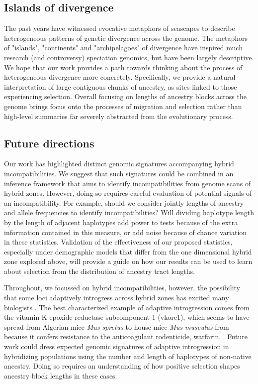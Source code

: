 \documentclass[12pt]{article}
\begin{document}
\subsection{Islands of divergence}  
The past years have witnessed evocative metaphors of seascapes to describe heterogeneous patterns of genetic divergence across the genome.  
The metaphors of "islands", "continents" and "archipelagoes" of divergence have inspired much research (and controversy) speciation genomics, but have been largely descriptive.  
We hope that our work provides a path towards thinking about the process of heterogeneous divergence more concretely. %
Specifically, we provide a natural interpretation of large contiguous chunks of ancestry, as sites linked to those experiencing selection.   
Overall focusing on lengths of ancestry blocks across the genome brings focus onto the processes of migration and selection rather than high-level summaries far severely abstracted from the evolutionary process. 


\subsection*{Future directions}
Our work has highlighted distinct genomic signatures accompanying hybrid incompatibilities. 
We suggest that such signatures could be combined in an inference framework that aims to identify incompatibilities from genome scans of hybrid zones.  
However, doing so requires careful evaluation of potential signals of an incompatibility. 
For example, should we consider jointly lengths of ancestry and allele frequencies to identify incompatibilities?
Will dividing haplotype length by the length of adjacent haplotypes add power to tests because of the extra information contained in this measure, or add noise because of chance variation in these statistics.  
Validation of the effectiveness of our proposed statistics, especially under demographic models that differ from the one dimensional hybrid zone explored above, will  provide a guide on how our results can be used to learn about selection from the distribution of ancestry tract lengths.

Throughout, we focussed on hybrid incompatibilities, however, the possibility that some loci adaptively introgress across hybrid zones has excited many biologists \citep{Arnold2004}.   
The best characterized example of adaptive introgression comes from the vitamin K epoxide reductase subcomponent 1 (vkorc1), which seems to have spread from Algerian mice \emph{Mus spretus} to house mice \emph{Mus musculus} from because it confers resistance to the anticoagulant rodenticide, warfarin. \citep{Song2011}. 
Future work could dress expected genomic signatures of adaptive introgression in hybridizing populations using the number and length of haplotypes of non-native ancestry. 
Doing so requires an understanding of how positive selection shapes ancestry block lengths in these cases. 
\end{document}
